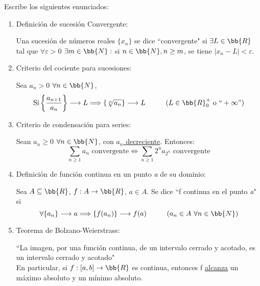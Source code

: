 \documentclass[12pt]{article}
\begin{document}
    \begin{ejercicio}[2.5 puntos]
        Escribe los siguientes enunciados:
        \begin{enumerate}
            \item Definición de sucesión Convergente:

            Una sucesión de números reales $\{x_n\}$ se dice ``convergente" si $\exists L \in \bb{R}$ tal que $\forall \varepsilon > 0 $ $\exists m \in \bb{N}: $ si $n \in \bb{N}, n\geq m$, se tiene $|x_n-L|<\varepsilon$.
            
            \item Criterio del cociente para sucesiones:

            Sea $a_n > 0$  $\forall n \in \bb{N}$,
            \[
            \text{Si} \left\{ \dfrac{a_{n+1}}{a_n}\right\} \longrightarrow L \Longrightarrow \{ \sqrt[n]{a_n}\} \longrightarrow L \hspace{1cm} (L \in \bb{R}_0^+ \text{ o } ``+\infty")
            \]
            
            \item Criterio de condensación para series:

            Sean $a_n \geq 0$ $\forall n \in \bb{N}$, con \underline{$a_n$ decreciente}. Entonces:
            \[
            \sum_{n\geq 1}a_n \text{ convergente} \Longleftrightarrow \sum_{n\geq1}2^n a_{2^n} \text{ convergente}
            \]
            \item Definición de función continua en un punto \textit{a} de su dominio:

            Sea $A \subseteq \bb{R}$, $f:A \rightarrow\bb{R}$, $a \in A$. Se dice ``f continua en el punto \textit{a}" si
            \[
            \forall\{a_n\} \longrightarrow a \Longrightarrow \{f(a_n)\} \longrightarrow f(a) \hspace{1cm} (a_n \in A \text{ } \forall n \in \bb{N})
            \]
            \item Teorema de Bolzano-Weierstrass:
            
            ``La imagen, por una función continua, de un intervalo cerrado y acotado, es un intervalo cerrado y acotado" \\
            En particular, si $f:[a,b] \rightarrow \bb{R}$ es continua, entonces f \underline{alcanza} un máximo absoluto y un mínimo absoluto.

            
        \end{enumerate}
    \end{ejercicio}
\end{document}
